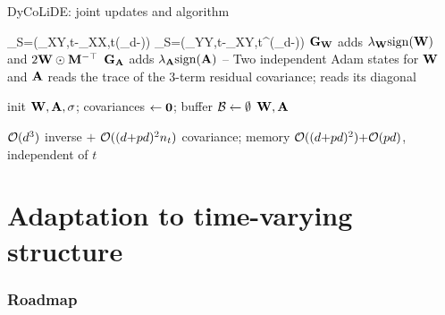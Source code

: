 \documentclass[9pt, aspectratio=169, xcolor=table]{beamer}
\begin{document}
\begin{frame}{DyCoLiDE: joint updates and algorithm}\svpos

	\bc
	\bi {} \svpos
	\be \nabla_{\bbW}S=\big(\bbSigma_{XY,t}\bbA-\bbSigma_{XX,t}(\bbI_d-\bbW)\big) \ee
	\be \nabla_{\bbA}S=\big(\bbSigma_{YY,t}\bbA-\bbSigma_{XY,t}^\top(\bbI_d-\bbW)\big) \ee
	\ai ${\mathbf G}_{{\mathbf W}}$ adds $\lambda_{{\mathbf W}}\mathrm{sign}({\mathbf W})$ and $2{\mathbf W}\odot{\ensuremath{\mathbf M}}^{-\top}$
	\ai ${\mathbf G}_{{\mathbf A}}$ adds $\lambda_{{\mathbf A}}\mathrm{sign}({\mathbf A})$ -- 
	\ai Two independent Adam states for ${\mathbf W}$ and ${\mathbf A}$\ei \svpos
	\bi {} reads the trace of the 3-term residual covariance;  reads its diagonal\ei
	{\footnotesize
	\begin{algorithm}[H]
	\DontPrintSemicolon
	\KwOut{$\widehat{\bbW},\widehat{\bbA}$}
	init ${\mathbf W},{\mathbf A},\sigma$; covariances $\gets{\ensuremath{\mathbf 0}}$; buffer ${\mathcal B}\gets\emptyset$\;
	\Return ${\mathbf W},{\mathbf A}$\;
	\end{algorithm}}
	\ec \svpos

	\bi {} ${\mathcal O}(d^3)$ inverse $+$ ${\mathcal O}((d{+}pd)^2 n_t)$ covariance; memory ${\mathcal O}((d{+}pd)^2){+}{\mathcal O}(pd)$, independent of $t$\ei

\end{frame}

\section{Adaptation to time-varying structure}
\begin{frame} \frametitle{Roadmap} \tableofcontents[currentsection] \end{frame}

\end{document}
